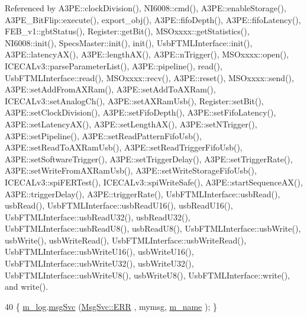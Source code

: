 Referenced by A3\+P\+E\+::clock\+Division(), N\+I6008\+::cmd(), A3\+P\+E\+::enable\+Storage(), A3\+P\+E\+\_\+\+Bit\+Flip\+::execute(), export\+\_\+obj(), A3\+P\+E\+::fifo\+Depth(), A3\+P\+E\+::fifo\+Latency(), F\+E\+B\+\_\+v1\+::gbt\+Status(), Register\+::get\+Bit(), M\+S\+Oxxxx\+::get\+Statistics(), N\+I6008\+::init(), Specs\+Master\+::init(), init(), Usb\+F\+T\+M\+L\+Interface\+::init(), A3\+P\+E\+::latency\+A\+X(), A3\+P\+E\+::length\+A\+X(), A3\+P\+E\+::n\+Trigger(), M\+S\+Oxxxx\+::open(), I\+C\+E\+C\+A\+Lv3\+::parse\+Parameter\+List(), A3\+P\+E\+::pipeline(), read(), Usb\+F\+T\+M\+L\+Interface\+::read(), M\+S\+Oxxxx\+::recv(), A3\+P\+E\+::reset(), M\+S\+Oxxxx\+::send(), A3\+P\+E\+::set\+Add\+From\+A\+X\+Ram(), A3\+P\+E\+::set\+Add\+To\+A\+X\+Ram(), I\+C\+E\+C\+A\+Lv3\+::set\+Analog\+Ch(), A3\+P\+E\+::set\+A\+X\+Ram\+Usb(), Register\+::set\+Bit(), A3\+P\+E\+::set\+Clock\+Division(), A3\+P\+E\+::set\+Fifo\+Depth(), A3\+P\+E\+::set\+Fifo\+Latency(), A3\+P\+E\+::set\+Latency\+A\+X(), A3\+P\+E\+::set\+Length\+A\+X(), A3\+P\+E\+::set\+N\+Trigger(), A3\+P\+E\+::set\+Pipeline(), A3\+P\+E\+::set\+Read\+Pattern\+Fifo\+Usb(), A3\+P\+E\+::set\+Read\+To\+A\+X\+Ram\+Usb(), A3\+P\+E\+::set\+Read\+Trigger\+Fifo\+Usb(), A3\+P\+E\+::set\+Software\+Trigger(), A3\+P\+E\+::set\+Trigger\+Delay(), A3\+P\+E\+::set\+Trigger\+Rate(), A3\+P\+E\+::set\+Write\+From\+A\+X\+Ram\+Usb(), A3\+P\+E\+::set\+Write\+Storage\+Fifo\+Usb(), I\+C\+E\+C\+A\+Lv3\+::spi\+F\+E\+R\+Test(), I\+C\+E\+C\+A\+Lv3\+::spi\+Write\+Safe(), A3\+P\+E\+::start\+Sequence\+A\+X(), A3\+P\+E\+::trigger\+Delay(), A3\+P\+E\+::trigger\+Rate(), Usb\+F\+T\+M\+L\+Interface\+::usb\+Read(), usb\+Read(), Usb\+F\+T\+M\+L\+Interface\+::usb\+Read\+U16(), usb\+Read\+U16(), Usb\+F\+T\+M\+L\+Interface\+::usb\+Read\+U32(), usb\+Read\+U32(), Usb\+F\+T\+M\+L\+Interface\+::usb\+Read\+U8(), usb\+Read\+U8(), Usb\+F\+T\+M\+L\+Interface\+::usb\+Write(), usb\+Write(), usb\+Write\+Read(), Usb\+F\+T\+M\+L\+Interface\+::usb\+Write\+Read(), Usb\+F\+T\+M\+L\+Interface\+::usb\+Write\+U16(), usb\+Write\+U16(), Usb\+F\+T\+M\+L\+Interface\+::usb\+Write\+U32(), usb\+Write\+U32(), Usb\+F\+T\+M\+L\+Interface\+::usb\+Write\+U8(), usb\+Write\+U8(), Usb\+F\+T\+M\+L\+Interface\+::write(), and write().


\begin{DoxyCode}
40 \{ \hyperlink{classObject_a0d269813dd7ac1f24bc143031e2963f2}{m\_log}.\hyperlink{classMsgSvc_ad25f18047920cc59a314e5098259711c}{msgSvc} (\hyperlink{classMsgSvc_ae671eb7301996cd049d2da8a65925926a35a9d7166e9896af4ec8fb33bf5f1772}{MsgSvc::ERR}     , mymsg, \hyperlink{classObject_a8b83c95c705d2c3ba0d081fe1710f48d}{m\_name} ); \}
\end{DoxyCode}
\mbox{\label{classObject_ad7f6c457733082efa2f9ff5f5c8e119a}} 
